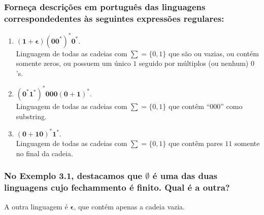             \subsubsection{Forneça descrições em português das linguagens correspon\-dedentes às seguintes expressões regulares:}
            \begin{enumerate}[label={\bfseries \alph*)}]
                \item $\mathbf{(1+\epsilon)(00^*)^*0^*}$.
                    \\ Linguagem de todas as cadeias com $\sum=\{0,1\}$ que são ou vazias, ou contém somente zeros, ou possuem um único $1$ seguido por múltiplos (ou nenhum) $0$'s.
                \item $\mathbf{(0^*1^*)^*000(0+1)^*}$.
                    \\ Linguagem de todas as cadeias com $\sum=\{0,1\}$ que contêm “000” como substring.
                \item $\mathbf{(0+10)^*1^*}$.
                    \\ Linguagem de todas as cadeias com $\sum=\{0,1\}$ que contêm pares $11$ somente no final da cadeia.
            \end{enumerate}

            \subsubsection{No Exemplo 3.1, destacamos que $\emptyset$ é uma das duas linguagens cujo fechammento é finito. Qual é a outra?}
                A outra linguagem é $\mathbf{\epsilon}$, que contém apenas a cadeia vazia.